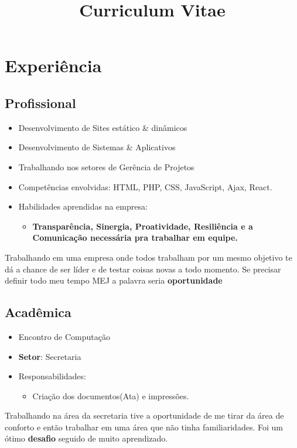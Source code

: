 \documentclass[10pt, a4paper, roman]{moderncv} %
\title{Curriculum Vitae}
\begin{document}
\makecvtitle %

\section{Experiência}

\subsection{Profissional}


\vspace{0.2cm}
{
    \begin{itemize}
      \item Desenvolvimento de Sites estático \& dinâmicos
    	\item Desenvolvimento de Sistemas \& Aplicativos
      \item Trabalhando nos setores de Gerência de Projetos
    	\item Competências envolvidas: HTML, PHP, CSS, JavaScript, Ajax, React.
      \item Habilidades aprendidas na empresa:
      \begin{itemize}
        \item \textbf{Transparência, Sinergia, Proatividade, Resiliência e a Comunicação necessária pra trabalhar em equipe.}
      \end{itemize}
    \end{itemize}
    Trabalhando em uma empresa onde todos trabalham por um mesmo objetivo te dá a chance de ser líder e de testar coisas novas a todo momento. Se precisar definir todo meu tempo MEJ a palavra seria \textbf{oportunidade}
}

\vspace{0.5cm}

\subsection{Acadêmica}


\vspace{0.2cm}
{
	\begin{itemize}
		\item Encontro de Computação
		\item \textbf{Setor}: Secretaria
    \item Responsabilidades:
    \begin{itemize}
      \item Criação dos documentos(Ata) e impressões.
    \end{itemize}
	\end{itemize}
  Trabalhando na área da secretaria tive a oportunidade de me tirar da área de conforto e então trabalhar em uma área que não tinha familiaridades. Foi um ótimo \textbf{desafio} seguido de muito aprendizado.
}
\end{document}
